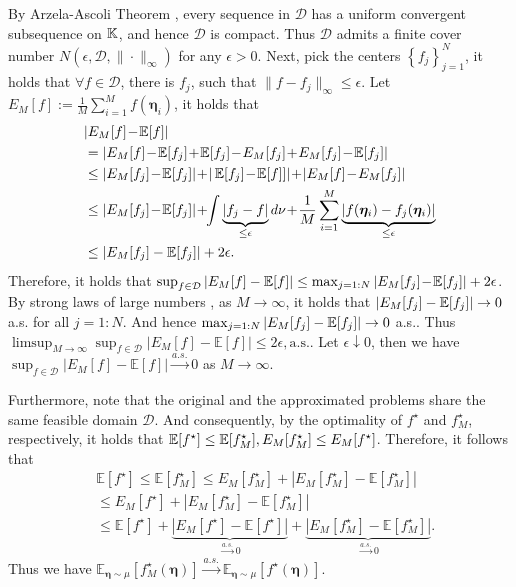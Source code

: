 \begin{pf}
    By Arzela-Ascoli Theorem \citep[Thm~11.28]{rudin1987real}, every sequence in $\mathcal{D}$ has a uniform convergent subsequence on $\mathbb{K}$, and hence $\mathcal{D}$ is compact. Thus $\mathcal{D}$ admits a finite cover number \citep[Def~2.1.5]{wellner2013weak} $N(\epsilon, \mathcal{D}, \|\cdot\|_\infty)$ for any $\epsilon > 0$. 
    Next, pick the centers $\left\{f_j\right\}_{j=1}^N$, it holds that $\forall f\in \mathcal{D}$, there is $f_j$, such that $\|f-f_j\|_\infty\leq\epsilon$. Let $E_M[f]:=\frac{1}{M}\sum_{i=1}^{M} f(\bm\eta_i)$, it holds that
    \begin{align*}
        &|E_M[f]\!-\!\mathbb{E}[f]|\\
        &=|E_M[f]\!-\!\mE[f_j]\!+\!\mE[f_j]\!-\!E_M[f_j]\!+\!E_M[f_j]\!-\!\mE[f_j]|\\
        &\le \left|E_M[f_j]\!-\!\mathbb{E}[f_j]\right|\!+\!|\mE[f_j]\!-\!\mE[f]]|\!+\!|E_M[f]\!-\!E_M[f_j]|\\
        &\le \left|E_M[f_j]\!-\!\mathbb{E}[f_j]\right|\!+\!\!\int\underbrace{|f_j-f|}_{\le \epsilon}d\nu\!+\!\frac{1}{M}\sum_{i=1}^M\underbrace{|f(\bm\eta_i)-f_j(\bm\eta_i)|}_{\le \epsilon}\\
        &\leq \left|E_M[f_j]-\mathbb{E}[f_j]\right|+2\epsilon.
    \end{align*}
    Therefore, it holds that $\sup_{f\in\mathcal D}|E_M[f]-\operatorname*{\mathbb{E}}[f]|\le \max_{j=1:N}|E_M[f_j]\!-\!\operatorname*{\mathbb{E}}[f_j]|+2\epsilon$.
    By strong laws of large numbers \citep[Thm~5.23]{kallenberg1997foundations}, as $M\rightarrow\infty$, it holds that $|E_M[f_j]-\operatorname*{\mathbb{E}}[f_j]|\rightarrow 0$ a.s. for all $j=1:N$. And hence $\max_{j=1:N} |E_M[f_j]-\operatorname*{\mathbb{E}}[f_j]|\rightarrow 0$ a.s..
    Thus $\limsup_{M\rightarrow\infty}\sup_{f\in\mathcal{D}}\left|E_M[f]-\mathbb{E}[f]\right|\leq 2\epsilon, \text{a.s.}$. Let $\epsilon\downarrow0$, then we have $\sup_{f\in\mathcal{D}}\left|E_M[f]-\mathbb{E}[f]\right|\xrightarrow{a.s.} 0$ as $M\rightarrow \infty$.

    Furthermore, note that the original and the approximated problems share the same feasible domain $\mathcal D$. And consequently, by the optimality of $f^\star$ and $f^\star_M$, respectively, it holds that $\operatorname*{\mathbb{E}}[f^\star] \leq \operatorname*{\mathbb{E}}[f^\star_M],E_M[f^\star_M] \leq E_M[f^\star]$. Therefore, it follows that
    \begin{align*}
        &\mathbb{E}[f^\star] \leq \mathbb{E}[f^\star_M] \leq E_M[f^\star_M] + \left|E_M[f^\star_M]-\mathbb{E}[f^\star_M]\right|\\
        &\leq E_M[f^\star] + \left|E_M[f^\star_M]-\mathbb{E}[f^\star_M]\right|\\
        &\leq \mathbb{E}[f^\star] + \underbrace{\left|E_M[f^\star]-\mathbb{E}[f^\star]\right|}_{\xrightarrow{a.s.}0}+\underbrace{\left|E_M[f^\star_M]-\mathbb{E}[f^\star_M]\right|}_{\xrightarrow{a.s.}0}.
    \end{align*}
    Thus we have $\mathbb{E}_{\bm{\eta}\sim \mu}[f^\star_M(\bm{\eta})] \xrightarrow{a.s.}\mathbb{E}_{\bm{\eta}\sim \mu}[f^\star(\bm{\eta})]$.
\end{pf}

